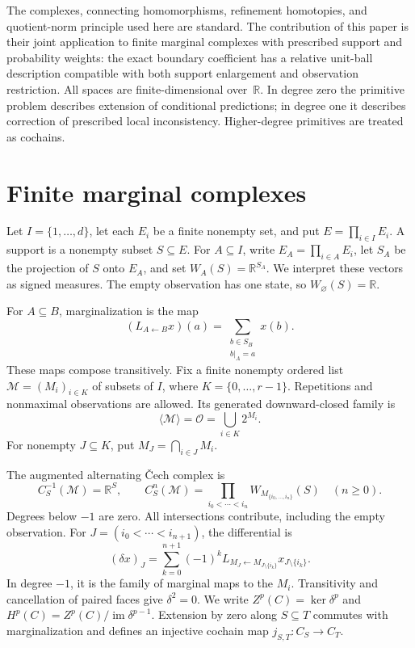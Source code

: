 \documentclass[11pt,a4paper]{article}
\numberwithin{equation}{section}
\theoremstyle{remark}
\newcommand{\R}{\mathbb R}
\newcommand{\M}{\mathcal M}
\newcommand{\OO}{\mathcal O}
\newcommand{\im}{\operatorname{im}}
\begin{document}
The complexes, connecting homomorphisms, refinement homotopies, and quotient-norm principle used here are standard. The contribution of this paper is their joint application to finite marginal complexes with prescribed support and probability weights: the exact boundary coefficient has a relative unit-ball description compatible with both support enlargement and observation restriction. All spaces are finite-dimensional over~$\R$. In degree zero the primitive problem describes extension of conditional predictions; in degree one it describes correction of prescribed local inconsistency. Higher-degree primitives are treated as cochains.

\section{Finite marginal complexes}\label{sec:complex}
Let $I=\{1,\ldots,d\}$, let each $E_i$ be a finite nonempty set, and put $E=\prod_{i\in I}E_i$. A support is a nonempty subset $S\subseteq E$. For $A\subseteq I$, write $E_A=\prod_{i\in A}E_i$, let $S_A$ be the projection of $S$ onto $E_A$, and set $W_A(S)=\R^{S_A}$. We interpret these vectors as signed measures. The empty observation has one state, so $W_\varnothing(S)=\R$.

For $A\subseteq B$, marginalization is the map
\begin{equation}\label{eq:marginal}
 (L_{A\leftarrow B}x)(a)=\sum_{\substack{b\in S_B\\b|_A=a}}x(b).
\end{equation}
These maps compose transitively. Fix a finite nonempty ordered list $\M=(M_i)_{i\in K}$ of subsets of $I$, where $K=\{0,\ldots,r-1\}$. Repetitions and nonmaximal observations are allowed. Its generated downward-closed family is
\[
 \langle\M\rangle=\OO=\bigcup_{i\in K}2^{M_i}.
\]
For nonempty $J\subseteq K$, put $M_J=\bigcap_{i\in J}M_i$.

The augmented alternating \v{C}ech complex is
\begin{equation}\label{eq:complex}
 C_S^{-1}(\M)=\R^S,\qquad
 C_S^n(\M)=\prod_{i_0<\cdots<i_n}W_{M_{\{i_0,\ldots,i_n\}}}(S)\quad(n\ge0).
\end{equation}
Degrees below $-1$ are zero. All intersections contribute, including the empty observation. For $J=(i_0<\cdots<i_{n+1})$, the differential is
\begin{equation}\label{eq:delta}
 (\delta x)_J=\sum_{k=0}^{n+1}(-1)^k
 L_{M_J\leftarrow M_{J\setminus\{i_k\}}}x_{J\setminus\{i_k\}}.
\end{equation}
In degree $-1$, it is the family of marginal maps to the $M_i$. Transitivity and cancellation of paired faces give $\delta^2=0$. We write $Z^p(C)=\ker\delta^p$ and $H^p(C)=Z^p(C)/\im\delta^{p-1}$. Extension by zero along $S\subseteq T$ commutes with marginalization and defines an injective cochain map $j_{S,T}:C_S\to C_T$.
\end{document}
